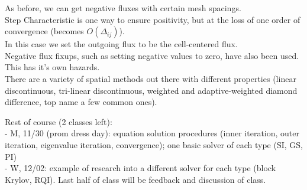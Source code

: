\documentclass[12pt]{article}
\begin{document}
As before, we can get negative fluxes with certain mesh spacings.\\
Step Characteristic is one way to ensure positivity, but at the loss of one order of convergence (becomes $O(\Delta_{ij})$).\\
In this case we set the outgoing flux to be the cell-centered flux. \\
Negative flux fixups, such as setting negative values to zero, have also been used. \\
This has it's own hazards. \\
There are a variety of spatial methods out there with different properties (linear discontinuous, tri-linear discontinuous, weighted and adaptive-weighted diamond difference, top name a few common ones). 


Rest of course (2 classes left):\\
- M, 11/30 (prom dress day): equation solution procedures (inner iteration, outer iteration, eigenvalue iteration, convergence); one basic solver of each type (SI, GS, PI)\\ 
- W, 12/02: example of research into a different solver for each type (block Krylov, RQI). Last half of class will be feedback and discussion of class.
\end{document}
